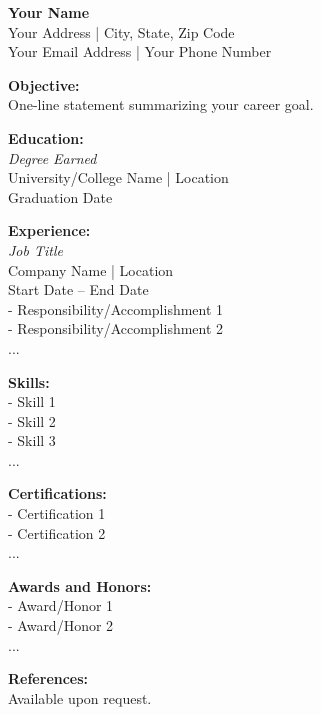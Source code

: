 \documentclass[a4paper,10pt]{article}
\begin{document}
\begin{center}
    \textbf{\LARGE Your Name} \\
    \vspace{5pt}
    Your Address | City, State, Zip Code \\
    Your Email Address | Your Phone Number
\end{center}

\noindent \textbf{Objective:} \\
One-line statement summarizing your career goal.

\noindent \textbf{Education:} \\
\textit{Degree Earned} \\
University/College Name | Location \\
Graduation Date

\noindent \textbf{Experience:} \\
\textit{Job Title} \\
Company Name | Location \\
Start Date -- End Date \\
- Responsibility/Accomplishment 1 \\
- Responsibility/Accomplishment 2 \\
...

\noindent \textbf{Skills:} \\
- Skill 1 \\
- Skill 2 \\
- Skill 3 \\
...

\noindent \textbf{Certifications:} \\
- Certification 1 \\
- Certification 2 \\
...

\noindent \textbf{Awards and Honors:} \\
- Award/Honor 1 \\
- Award/Honor 2 \\
...

\noindent \textbf{References:} \\
Available upon request.
\end{document}
